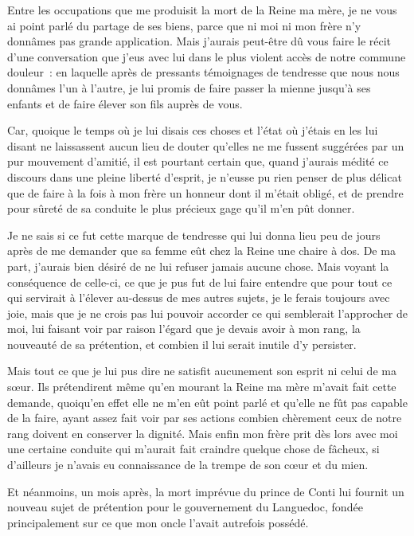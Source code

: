 \documentclass[french,twoside]{book} %
\begin{document}
Entre les occupations que me produisit la mort de la Reine ma mère, je ne vous ai point parlé du partage de ses biens, parce que ni moi ni mon frère n’y donnâmes pas grande application. Mais j’aurais peut-être dû vous faire le récit d’une conversation que j’eus avec lui dans le plus violent accès de notre commune douleur : en laquelle après de pressants témoignages de tendresse que nous nous donnâmes l’un à l’autre, je lui promis de faire passer la mienne jusqu’à ses enfants et de faire élever son fils auprès de vous.\par
Car, quoique le temps où je lui disais ces choses et l’état où j’étais en les lui disant ne laissassent aucun lieu de douter qu’elles ne me fussent suggérées par un pur mouvement d’amitié, il est pourtant certain que, quand j’aurais médité ce discours dans une pleine liberté d’esprit, je n’eusse pu rien penser de plus délicat que de faire à la fois à mon frère un honneur dont il m’était obligé, et de prendre pour sûreté de sa conduite le plus précieux gage qu’il m’en pût donner.\par
Je ne sais si ce fut cette marque de tendresse qui lui donna lieu peu de jours après de me demander que sa femme eût chez la Reine une chaire à dos. De ma part, j’aurais bien désiré de ne lui refuser jamais aucune chose. Mais voyant la conséquence de celle-ci, ce que je pus fut de lui faire entendre que pour tout ce qui servirait à l’élever au-dessus de mes autres sujets, je le ferais toujours avec joie, mais que je ne crois pas lui pouvoir accorder ce qui semblerait l’approcher de moi, lui faisant voir par raison l’égard que je devais avoir à mon rang, la nouveauté de sa prétention, et combien il lui serait inutile d’y persister.\par
Mais tout ce que je lui pus dire ne satisfit aucunement son esprit ni celui de ma sœur. Ils prétendirent même qu’en mourant la Reine ma mère m’avait fait cette demande, quoiqu’en effet elle ne m’en eût point parlé et qu’elle ne fût pas capable de la faire, ayant assez fait voir par ses actions combien chèrement ceux de notre rang doivent en conserver la dignité. Mais enfin mon frère prit dès lors avec moi une certaine conduite qui m’aurait fait craindre quelque chose de fâcheux, si d’ailleurs je n’avais eu connaissance de la trempe de son cœur et du mien.\par
Et néanmoins, un mois après, la mort imprévue du prince de Conti lui fournit un nouveau sujet de prétention pour le gouvernement du Languedoc, fondée principalement sur ce que mon oncle l’avait autrefois possédé.\par
\end{document}
